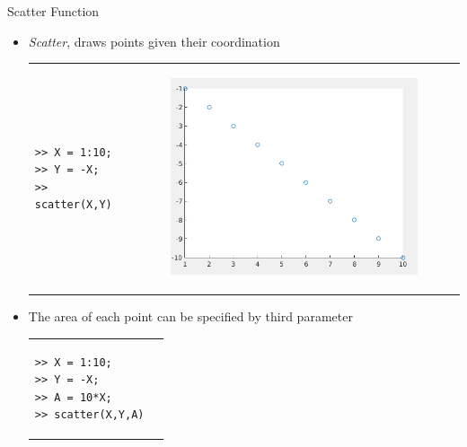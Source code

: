 \documentclass{beamer}
\begin{document}
\begin{frame}[fragile]{Scatter Function}
	\begin{block}{}
		\begin{itemize}
			\item \textit{Scatter}, draws points given their coordination
			\begin{tabular}{p{0.4\textwidth}p{}}
			\begin{minipage}{}
			\java
				\begin{lstlisting}
>> X = 1:10;
>> Y = -X;
>> scatter(X,Y)
				\end{lstlisting}
			
			\end{minipage}
			&
			\begin{minipage}{0.4\textwidth}
			\begin{figure}[H]
				\centering
				\includegraphics[scale=0.2]{./Imgs/scatter1.png}
			\end{figure}
			
			\end{minipage}
			\end{tabular}
			
			\item The area of each point can be specified by third parameter
			
			\begin{tabular}{p{0.4\textwidth}p{}}
			\begin{minipage}{}
			\java
				\begin{lstlisting}
>> X = 1:10;
>> Y = -X;
>> A = 10*X;
>> scatter(X,Y,A)
				\end{lstlisting}
			

\end{minipage}
\end{tabular}
\end{itemize}
\end{block}
\end{frame}
\end{document}
